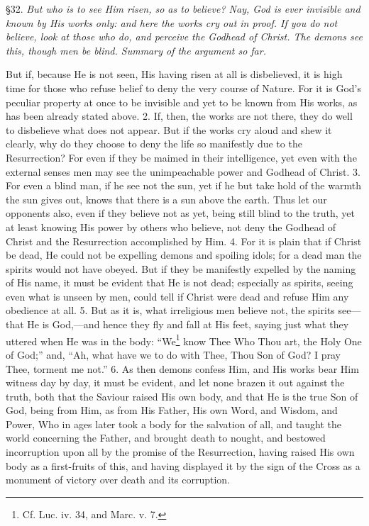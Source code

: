 §32. \emph{But who is to see Him risen, so as to believe? Nay, God is ever invisible and known by His works only: and here the works cry out in proof. If you do not believe, look at those who do, and perceive the Godhead of Christ. The demons see this, though men be blind. Summary of the argument so far.}

But if, because He is not seen, His having risen at all is disbelieved, it is high time for those who refuse belief to deny the very course of Nature. For it is God’s peculiar property at once to be invisible and yet to be known from His works, as has been already stated above. 2. If, then, the works are not there, they do well to disbelieve what does not appear. But if the works cry aloud and shew it clearly, why do they choose to deny the life so manifestly due to the Resurrection? For even if they be maimed in their intelligence, yet even with the external senses men may see the unimpeachable power and Godhead of Christ. 3. For even a blind man, if he see not the sun, yet if he but take hold of the warmth the sun gives out, knows that there is a sun above the earth. Thus let our opponents also, even if they believe not as yet, being still blind to the truth, yet at least knowing His power by others who believe, not deny the Godhead of Christ and the Resurrection accomplished by Him. 4. For it is plain that if Christ be dead, He could not be expelling demons and spoiling idols; for a dead man the spirits would not have obeyed. But if they be manifestly expelled by the naming of His name, it must be evident that He is not dead; especially as spirits, seeing even what is unseen by men, could tell if Christ were dead and refuse Him any obedience at all. 5. But as it is, what irreligious men believe not, the spirits see—that He is God,—and hence they fly and fall at His feet, saying just what they uttered when He was in the body: “We\footnote{Cf. Luc. iv. 34, and Marc. v. 7.} know Thee Who Thou art, the Holy One of God;” and, “Ah, what have we to do with Thee, Thou Son of God? I pray Thee, torment me not.” 6. As then demons confess Him, and His works bear Him witness day by day, it must be evident, and let none brazen it out against the truth, both that the Saviour raised His own body, and that He is the true Son of God, being from Him, as from His Father, His own Word, and Wisdom, and Power, Who in ages later took a body for the salvation of all, and taught the world concerning the Father, and brought death to nought, and bestowed incorruption upon all by the promise of the Resurrection, having raised His own body as a first-fruits of this, and having displayed it by the sign of the Cross as a monument of victory over death and its corruption.

